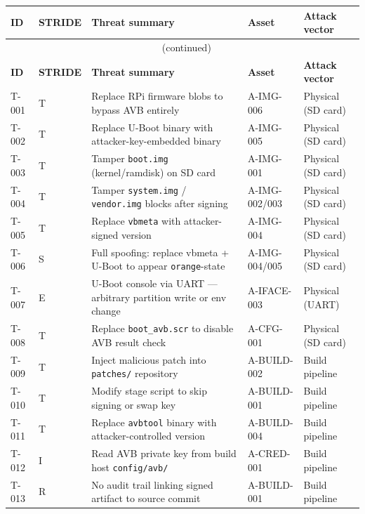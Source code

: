 \begin{tabularx}{\textwidth}{p{0.8cm} p{1.5cm} X p{3.2cm} p{2.8cm}}
\caption{Threat scenarios (23 total)}
\label{tab:threats} \\
\toprule
\textbf{ID} & \textbf{STRIDE} & \textbf{Threat summary} & \textbf{Asset} & \textbf{Attack vector} \\
\midrule
\endfirsthead
\multicolumn{5}{c}{\tablename\ \thetable{} (continued)} \\
\toprule
\textbf{ID} & \textbf{STRIDE} & \textbf{Threat summary} & \textbf{Asset} & \textbf{Attack vector} \\
\midrule
\endhead
\bottomrule
\endfoot
T-001 & T & Replace RPi firmware blobs to bypass AVB entirely & A-IMG-006 & Physical (SD card) \\
T-002 & T & Replace U-Boot binary with attacker-key-embedded binary & A-IMG-005 & Physical (SD card) \\
T-003 & T & Tamper \texttt{boot.img} (kernel/ramdisk) on SD card & A-IMG-001 & Physical (SD card) \\
T-004 & T & Tamper \texttt{system.img} / \texttt{vendor.img} blocks after signing & A-IMG-002/003 & Physical (SD card) \\
T-005 & T & Replace \texttt{vbmeta} with attacker-signed version & A-IMG-004 & Physical (SD card) \\
T-006 & S & Full spoofing: replace vbmeta + U-Boot to appear \texttt{orange}-state & A-IMG-004/005 & Physical (SD card) \\
T-007 & E & U-Boot console via UART --- arbitrary partition write or env change & A-IFACE-003 & Physical (UART) \\
T-008 & T & Replace \texttt{boot\_avb.scr} to disable AVB result check & A-CFG-001 & Physical (SD card) \\
T-009 & T & Inject malicious patch into \texttt{patches/} repository & A-BUILD-002 & Build pipeline \\
T-010 & T & Modify stage script to skip signing or swap key & A-BUILD-001 & Build pipeline \\
T-011 & T & Replace \texttt{avbtool} binary with attacker-controlled version & A-BUILD-004 & Build pipeline \\
T-012 & I & Read AVB private key from build host \texttt{config/avb/} & A-CRED-001 & Build pipeline \\
T-013 & R & No audit trail linking signed artifact to source commit & A-BUILD-001 & Build pipeline \\

\end{tabularx}
